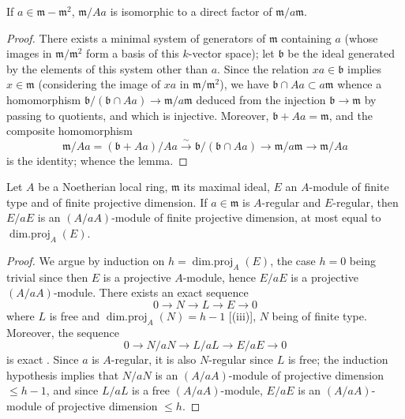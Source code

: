 \begin{lemma}[17.3.1.3]
\label{0.17.3.1.3}
If $a\in\mathfrak{m}-\mathfrak{m}^2$, $\mathfrak{m}/Aa$ is isomorphic to a direct factor of $\mathfrak{m}/a\mathfrak{m}$.
\end{lemma}

\begin{proof}
There exists a minimal system of generators of $\mathfrak{m}$ containing $a$ (whose images in $\mathfrak{m}/\mathfrak{m}^2$ form a basis of this $k$-vector space);
let $\mathfrak{b}$ be the ideal generated by the elements of this system other than $a$.
Since the relation $xa\in\mathfrak{b}$ implies $x\in\mathfrak{m}$ (considering the image of $xa$ in $\mathfrak{m}/\mathfrak{m}^2$), we have $\mathfrak{b}\cap Aa\subset a\mathfrak{m}$ whence a homomorphism $\mathfrak{b}/(\mathfrak{b}\cap Aa)\to\mathfrak{m}/a\mathfrak{m}$ deduced from the injection $\mathfrak{b}\to\mathfrak{m}$ by passing to quotients, and which is injective.
Moreover, $\mathfrak{b}+Aa=\mathfrak{m}$, and the composite homomorphism
\[
  \mathfrak{m}/Aa=(\mathfrak{b}+Aa)/Aa\xrightarrow{\sim}\mathfrak{b}/(\mathfrak{b}\cap Aa)\to\mathfrak{m}/a\mathfrak{m}\to\mathfrak{m}/Aa
\]
is the identity; whence the lemma.
\end{proof}

\begin{lemma}[17.3.1.4]
\label{0.17.3.1.4}
Let $A$ be a Noetherian local ring, $\mathfrak{m}$ its maximal ideal, $E$ an $A$-module of finite type and of finite projective dimension.
If $a\in\mathfrak{m}$ is $A$-regular and $E$-regular, then $E/aE$ is an $(A/aA)$-module of finite projective dimension, at most equal to $\operatorname{dim.proj}_A(E)$.
\end{lemma}

\begin{proof}
We argue by induction on $h=\operatorname{dim.proj}_A(E)$, the case $h=0$ being trivial since then $E$ is a projective $A$-module, hence $E/aE$ is a projective $(A/aA)$-module.
There exists an exact sequence
\[
  0\to N\to L\to E\to 0
\]
where $L$ is free and $\operatorname{dim.proj}_A(N)=h-1$ [(iii)], $N$ being of finite type.
Moreover, the sequence
\[
  0\to N/aN\to L/aL\to E/aE\to 0
\]
is exact .
Since $a$ is $A$-regular, it is also $N$-regular since $L$ is free;
the induction hypothesis implies that $N/aN$ is an $(A/aA)$-module of projective dimension $\leq h-1$, and since $L/aL$ is a free $(A/aA)$-module, $E/aE$ is an $(A/aA)$-module of projective dimension $\leq h$.
\end{proof}

